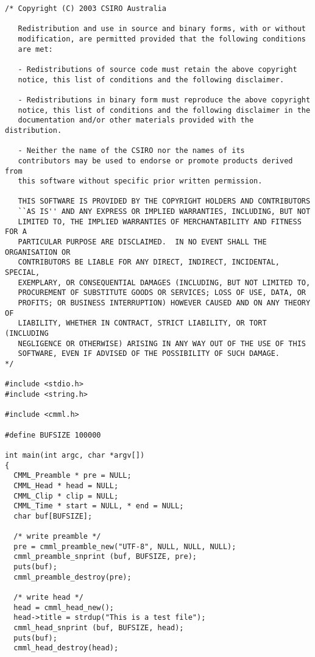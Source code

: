 \footnotesize\begin{verbatim}/* Copyright (C) 2003 CSIRO Australia

   Redistribution and use in source and binary forms, with or without
   modification, are permitted provided that the following conditions
   are met:
   
   - Redistributions of source code must retain the above copyright
   notice, this list of conditions and the following disclaimer.
   
   - Redistributions in binary form must reproduce the above copyright
   notice, this list of conditions and the following disclaimer in the
   documentation and/or other materials provided with the distribution.
   
   - Neither the name of the CSIRO nor the names of its
   contributors may be used to endorse or promote products derived from
   this software without specific prior written permission.
   
   THIS SOFTWARE IS PROVIDED BY THE COPYRIGHT HOLDERS AND CONTRIBUTORS
   ``AS IS'' AND ANY EXPRESS OR IMPLIED WARRANTIES, INCLUDING, BUT NOT
   LIMITED TO, THE IMPLIED WARRANTIES OF MERCHANTABILITY AND FITNESS FOR A
   PARTICULAR PURPOSE ARE DISCLAIMED.  IN NO EVENT SHALL THE ORGANISATION OR
   CONTRIBUTORS BE LIABLE FOR ANY DIRECT, INDIRECT, INCIDENTAL, SPECIAL,
   EXEMPLARY, OR CONSEQUENTIAL DAMAGES (INCLUDING, BUT NOT LIMITED TO,
   PROCUREMENT OF SUBSTITUTE GOODS OR SERVICES; LOSS OF USE, DATA, OR
   PROFITS; OR BUSINESS INTERRUPTION) HOWEVER CAUSED AND ON ANY THEORY OF
   LIABILITY, WHETHER IN CONTRACT, STRICT LIABILITY, OR TORT (INCLUDING
   NEGLIGENCE OR OTHERWISE) ARISING IN ANY WAY OUT OF THE USE OF THIS
   SOFTWARE, EVEN IF ADVISED OF THE POSSIBILITY OF SUCH DAMAGE.
*/

#include <stdio.h>
#include <string.h>

#include <cmml.h>

#define BUFSIZE 100000

int main(int argc, char *argv[])
{
  CMML_Preamble * pre = NULL;
  CMML_Head * head = NULL;
  CMML_Clip * clip = NULL;
  CMML_Time * start = NULL, * end = NULL;
  char buf[BUFSIZE];

  /* write preamble */
  pre = cmml_preamble_new("UTF-8", NULL, NULL, NULL);
  cmml_preamble_snprint (buf, BUFSIZE, pre);
  puts(buf);
  cmml_preamble_destroy(pre);

  /* write head */
  head = cmml_head_new();
  head->title = strdup("This is a test file");
  cmml_head_snprint (buf, BUFSIZE, head);
  puts(buf);
  cmml_head_destroy(head);


\end{verbatim}
